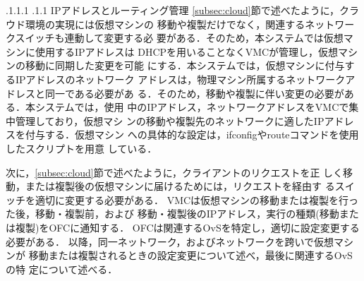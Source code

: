 \documentclass[a4paper, twocolumn]{jarticle}
\makeatletter
\def\subsection{\@startsection{subsection}{1}{\z@}%
 {.1\Cvs \@plus.1\Cdp \@minus.1\Cdp}%
 {.1\Cvs \@plus.1\Cdp}%
 {\normalfont\normalsize\bfseries}}
\makeatother
\begin{document}
\subsection{IPアドレスとルーティング管理}
\label{subsec:ip_routing}
\ref{subsec:cloud}節で述べたように，クラウド環境の実現には仮想マシンの
移動や複製だけでなく，関連するネットワークスイッチも連動して変更する必
要がある．そのため，本システムでは仮想マシンに使用するIPアドレスは
DHCPを用いることなくVMCが管理し，仮想マシンの移動に同期した変更を可能
にする．本システムでは，仮想マシンに付与するIPアドレスのネットワーク
アドレスは，物理マシン所属するネットワークアドレスと同一である必要があ
る．そのため，移動や複製に伴い変更の必要がある．本システムでは，使用
中のIPアドレス，ネットワークアドレスをVMCで集中管理しており，仮想マシ
ンの移動や複製先のネットワークに適したIPアドレスを付与する．仮想マシン
への具体的な設定は，ifconfigやrouteコマンドを使用したスクリプトを用意
している．

次に，\ref{subsec:cloud}節で述べたように，クライアントのリクエストを正
しく移動，または複製後の仮想マシンに届けるためには，リクエストを経由す
るスイッチを適切に変更する必要がある．
VMCは仮想マシンの移動または複製を行った後，移動・複製前，および
移動・複製後のIPアドレス，実行の種類(移動または複製)をOFCに通知する．
OFCは関連するOvSを特定し，適切に設定変更する必要がある．
以降，同一ネットワーク，およびネットワークを跨いで仮想マシンが
移動または複製されるときの設定変更について述べ，最後に関連するOvSの特
定について述べる．
\end{document}
